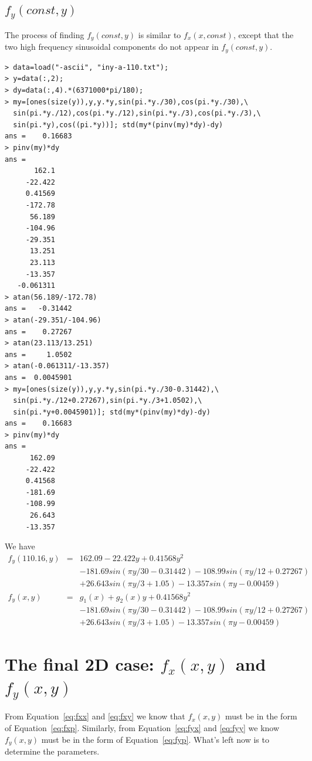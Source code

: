 \documentclass[a4paper]{article}
\begin{document}
\subsection{$f_y(const, y)$}

The process of finding $f_y(const, y)$ is similar to $f_x(x, const)$, except
that the two high frequency sinusoidal components do not appear in $f_y(const,
y)$.
\begin{verbatim}
> data=load("-ascii", "iny-a-110.txt");
> y=data(:,2);
> dy=data(:,4).*(6371000*pi/180);
> my=[ones(size(y)),y,y.*y,sin(pi.*y./30),cos(pi.*y./30),\
  sin(pi.*y./12),cos(pi.*y./12),sin(pi.*y./3),cos(pi.*y./3),\
  sin(pi.*y),cos((pi.*y))]; std(my*(pinv(my)*dy)-dy)
ans =    0.16683
> pinv(my)*dy
ans =
       162.1
     -22.422
     0.41569
     -172.78
      56.189
     -104.96
     -29.351
      13.251
      23.113
     -13.357
   -0.061311
> atan(56.189/-172.78)
ans =   -0.31442
> atan(-29.351/-104.96)
ans =    0.27267
> atan(23.113/13.251)
ans =     1.0502
> atan(-0.061311/-13.357)
ans =  0.0045901
> my=[ones(size(y)),y,y.*y,sin(pi.*y./30-0.31442),\
  sin(pi.*y./12+0.27267),sin(pi.*y./3+1.0502),\
  sin(pi.*y+0.0045901)]; std(my*(pinv(my)*dy)-dy)
ans =    0.16683
> pinv(my)*dy
ans =
      162.09
     -22.422
     0.41568
     -181.69
     -108.99
      26.643
     -13.357
\end{verbatim}

We have
\begin{eqnarray}
f_y(110.16,y) &=& 162.09-22.422y+0.41568y^2 \nonumber \\
              & & -181.69sin(\pi y/30-0.31442)-108.99sin(\pi y/12+0.27267) \nonumber \\
              & & +26.643sin(\pi y/3+1.05)-13.357sin(\pi y-0.00459) \\
\label{eq:fyy}
f_y(x,y)      &=& g_1(x)+g_2(x)y+0.41568y^2 \nonumber \\
              & & -181.69sin(\pi y/30-0.31442)-108.99sin(\pi y/12+0.27267) \nonumber \\
              & & +26.643sin(\pi y/3+1.05)-13.357sin(\pi y-0.00459)
\end{eqnarray}

\section{The final 2D case: $f_x(x,y)$ and $f_y(x,y)$}

From Equation~\ref{eq:fxx} and \ref{eq:fxy} we know that $f_x(x,y)$ must be in
the form of Equation~\ref{eq:fxp}.  Similarly, from Equation~\ref{eq:fyx} and
\ref{eq:fyy} we know $f_y(x,y)$ must be in the form of Equation~\ref{eq:fyp}.
What's left now is to determine the parameters.
\end{document}
